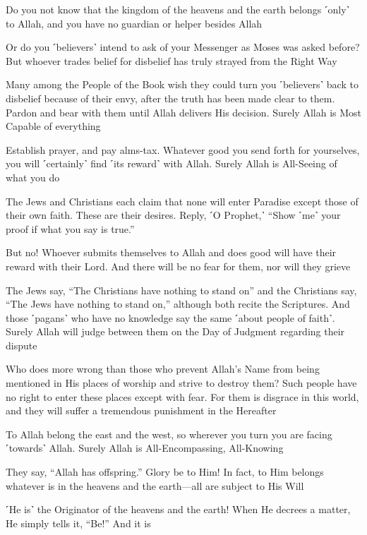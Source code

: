 Do you not know that the kingdom of the heavens and the earth belongs ˹only˺ to Allah, and you have no guardian or helper besides Allah

Or do you ˹believers˺ intend to ask of your Messenger as Moses was asked before? But whoever trades belief for disbelief has truly strayed from the Right Way

Many among the People of the Book wish they could turn you ˹believers˺ back to disbelief because of their envy, after the truth has been made clear to them. Pardon and bear with them until Allah delivers His decision. Surely Allah is Most Capable of everything

Establish prayer, and pay alms-tax. Whatever good you send forth for yourselves, you will ˹certainly˺ find ˹its reward˺ with Allah. Surely Allah is All-Seeing of what you do

The Jews and Christians each claim that none will enter Paradise except those of their own faith. These are their desires. Reply, ˹O Prophet,˺ “Show ˹me˺ your proof if what you say is true.”

But no! Whoever submits themselves to Allah and does good will have their reward with their Lord. And there will be no fear for them, nor will they grieve

The Jews say, “The Christians have nothing to stand on” and the Christians say, “The Jews have nothing to stand on,” although both recite the Scriptures. And those ˹pagans˺ who have no knowledge say the same ˹about people of faith˺. Surely Allah will judge between them on the Day of Judgment regarding their dispute

Who does more wrong than those who prevent Allah’s Name from being mentioned in His places of worship and strive to destroy them? Such people have no right to enter these places except with fear. For them is disgrace in this world, and they will suffer a tremendous punishment in the Hereafter

To Allah belong the east and the west, so wherever you turn you are facing ˹towards˺ Allah. Surely Allah is All-Encompassing, All-Knowing

They say, “Allah has offspring.” Glory be to Him! In fact, to Him belongs whatever is in the heavens and the earth—all are subject to His Will

˹He is˺ the Originator of the heavens and the earth! When He decrees a matter, He simply tells it, “Be!” And it is

